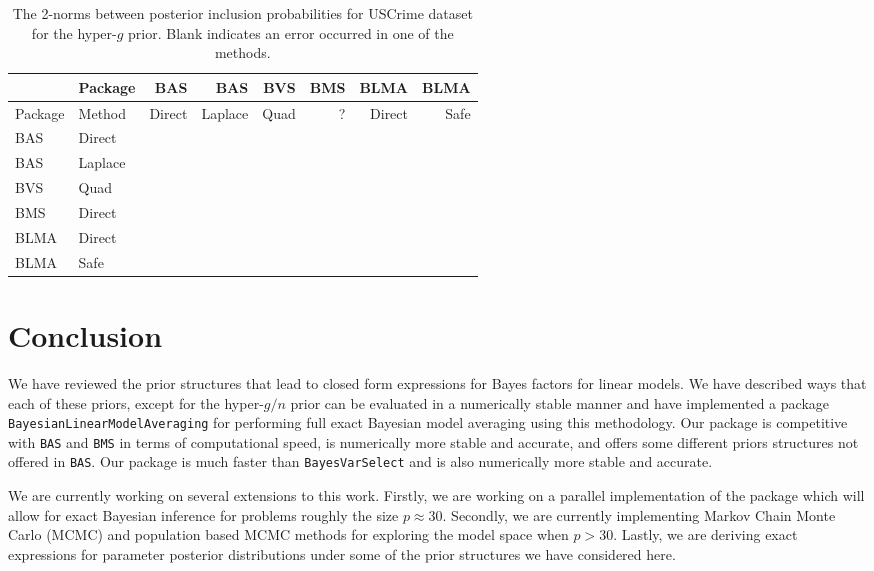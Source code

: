 \begin{table}[ht]
	\centering
{\small 
	\begin{tabular}{l|l|rrrrrr}
	&	Package & BAS       & BAS       & BVS        & BMS       & BLMA      & BLMA       \\
		\hline 
Package & Method  &  Direct    & Laplace   & Quad & ?         & Direct    & Safe      \\ 
\hline
BAS		& Direct  &            &           &      &           &           &           \\ 
BAS     & Laplace &            &           &      &           &           &           \\ 
BVS     & Quad    &            &           &      &           &           &           \\ 
BMS     & Direct  &            &           &      &           &           &           \\ 
BLMA    & Direct  &            &           &      &           &           &           \\ 
BLMA    & Safe    &            &           &      &           &           &           \\ 
	\end{tabular}
}
	\caption{The 2-norms between posterior inclusion probabilities for USCrime dataset 
	for the hyper-$g$ prior. Blank indicates an error occurred in one of the methods.}
	\label{tab:SummaryResults1}
\end{table}

 
 
\section{Conclusion}
\label{sec:conclusion}

We have reviewed the prior structures that lead to closed form expressions for Bayes factors for
linear models. We have described ways that each of these priors, except for the hyper-$g/n$ 
prior can be evaluated in a numerically stable manner and have implemented a package 
{\tt BayesianLinearModelAveraging} for performing full exact Bayesian model averaging using
this methodology. Our package is competitive with {\tt BAS} and {\tt BMS} in terms of computational speed,
is numerically more stable and accurate, and offers some different priors structures not
offered in {\tt BAS}. Our package is much faster than {\tt BayesVarSelect} and is also
numerically more stable and accurate.

We are currently working on several extensions to this work. Firstly, we are working on a
parallel implementation of the package which will allow for exact Bayesian inference for
problems roughly the size $p\approx 30$. Secondly, we are currently implementing  Markov
Chain Monte Carlo (MCMC) and population based MCMC methods for exploring the model space
when $p>30$. Lastly, we are deriving exact expressions for parameter posterior distributions
under some of the prior structures we have considered here.

